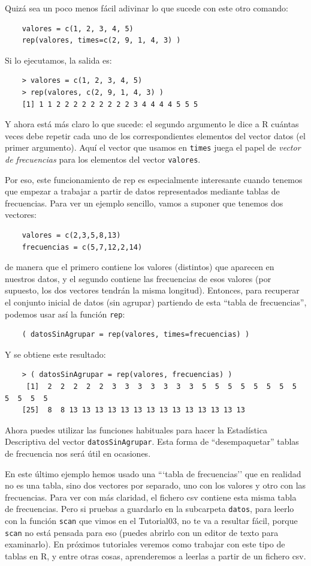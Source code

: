 \documentclass[10pt,a4paper]{article}\usepackage[]{graphicx}\usepackage[]{color}
\newcounter {cont01}
\begin{document}
Quizá sea un poco menos fácil adivinar lo que sucede con este otro comando:
    \begin{verbatim}
    valores = c(1, 2, 3, 4, 5)
    rep(valores, times=c(2, 9, 1, 4, 3) )
    \end{verbatim}
Si lo ejecutamos,  la salida es:
    \begin{verbatim}
    > valores = c(1, 2, 3, 4, 5)
    > rep(valores, c(2, 9, 1, 4, 3) )
    [1] 1 1 2 2 2 2 2 2 2 2 2 3 4 4 4 4 5 5 5
    \end{verbatim}
Y ahora está más claro lo que sucede: el segundo argumento le dice a R cuántas veces debe repetir cada uno de los correspondientes elementos del vector datos (el primer argumento). Aquí el vector que usamos en {\tt times} juega el papel de {\em vector de frecuencias} para los elementos del vector {\tt valores}.

Por eso, este funcionamiento de rep es especialmente interesante cuando tenemos que empezar a trabajar a partir de datos representados mediante tablas de frecuencias. Para ver un ejemplo sencillo, vamos a suponer que tenemos dos vectores:
    \begin{verbatim}
    valores = c(2,3,5,8,13)
    frecuencias = c(5,7,12,2,14)
    \end{verbatim}
de manera que el primero contiene los valores (distintos) que aparecen en nuestros datos, y el segundo contiene las frecuencias de esos valores (por supuesto, los dos vectores tendrán la misma longitud). Entonces, para recuperar el conjunto inicial de datos (sin agrupar) partiendo de esta ``tabla de frecuencias'', podemos usar así la función {\tt rep}:
    \begin{verbatim}
    ( datosSinAgrupar = rep(valores, times=frecuencias) )
    \end{verbatim}
Y se obtiene este resultado:
    \begin{verbatim}
    > ( datosSinAgrupar = rep(valores, frecuencias) )
     [1]  2  2  2  2  2  3  3  3  3  3  3  3  5  5  5  5  5  5  5  5  5  5  5  5
    [25]  8  8 13 13 13 13 13 13 13 13 13 13 13 13 13 13
    \end{verbatim}
Ahora puedes utilizar las funciones habituales para hacer la Estadística Descriptiva del vector {\tt datosSinAgrupar}. Esta forma de ``desempaquetar'' tablas de frecuencia nos será útil en ocasiones.

En este último ejemplo hemos usado una ```tabla de frecuencias'' que en realidad no es una tabla, sino dos vectores por separado, uno con los valores y otro con las frecuencias.  Para ver con más claridad, el  fichero csv  contiene esta misma tabla de frecuencias. Pero si pruebas a guardarlo en la subcarpeta {\tt datos}, para leerlo con la función {\tt scan} que vimos en el Tutorial03, no te va a resultar fácil, porque {\tt scan} no está pensada para eso (puedes abrirlo con un editor de texto para examinarlo). En próximos tutoriales veremos como trabajar con este tipo de tablas en R, y entre otras cosas, aprenderemos a leerlas a partir de un fichero csv.
\end{document}
